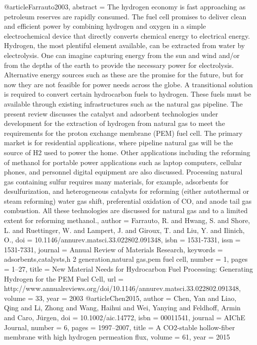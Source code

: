 @article{Farrauto2003,
abstract = {The hydrogen economy is fast approaching as petroleum reserves are rapidly consumed. The fuel cell promises to deliver clean and efficient power by combining hydrogen and oxygen in a simple electrochemical device that directly converts chemical energy to electrical energy. Hydrogen, the most plentiful element available, can be extracted from water by electrolysis. One can imagine capturing energy from the sun and wind and/or from the depths of the earth to provide the necessary power for electrolysis. Alternative energy sources such as these are the promise for the future, but for now they are not feasible for power needs across the globe. A transitional solution is required to convert certain hydrocarbon fuels to hydrogen. These fuels must be available through existing infrastructures such as the natural gas pipeline. The present review discusses the catalyst and adsorbent technologies under development for the extraction of hydrogen from natural gas to meet the requirements for the proton exchange membrane (PEM) fuel cell. The primary market is for residential applications, where pipeline natural gas will be the source of H2 used to power the home. Other applications including the reforming of methanol for portable power applications such as laptop computers, cellular phones, and personnel digital equipment are also discussed. Processing natural gas containing sulfur requires many materials, for example, adsorbents for desulfurization, and heterogeneous catalysts for reforming (either autothermal or steam reforming) water gas shift, preferential oxidation of CO, and anode tail gas combustion. All these technologies are discussed for natural gas and to a limited extent for reforming methanol.},
author = {Farrauto, R. and Hwang, S. and Shore, L. and Ruettinger, W. and Lampert, J. and Giroux, T. and Liu, Y. and Ilinich, O.},
doi = {10.1146/annurev.matsci.33.022802.091348},
isbn = {1531-7331},
issn = {1531-7331},
journal = {Annual Review of Materials Research},
keywords = {adsorbents,catalysts,h 2 generation,natural gas,pem fuel cell},
number = {1},
pages = {1--27},
title = {{New Material Needs for Hydrocarbon Fuel Processing: Generating Hydrogen for the PEM Fuel Cell}},
url = {http://www.annualreviews.org/doi/10.1146/annurev.matsci.33.022802.091348},
volume = {33},
year = {2003}
}
@article{Chen2015,
author = {Chen, Yan and Liao, Qing and Li, Zhong and Wang, Haihui and Wei, Yanying and Feldhoff, Armin and Caro, J{\"{u}}rgen},
doi = {10.1002/aic.14772},
isbn = {00011541},
journal = {AIChE Journal},
number = {6},
pages = {1997--2007},
title = {{A CO2-stable hollow-fiber membrane with high hydrogen permeation flux}},
volume = {61},
year = {2015}
}
